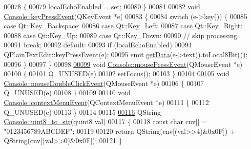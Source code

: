 \begin{DoxyCode}
00078 \{
00079     localEchoEnabled = set;
00080 \}
00081 
\hypertarget{a00087_source_l00082}{}\hyperlink{a00005_a558b58e3e68a167a7897a77bee78536c}{00082} \textcolor{keywordtype}{void} \hyperlink{a00005_a558b58e3e68a167a7897a77bee78536c}{Console::keyPressEvent}(QKeyEvent *e)
00083 \{
00084     \textcolor{keywordflow}{switch} (e->key()) \{
00085     \textcolor{keywordflow}{case} Qt::Key\_Backspace:
00086     \textcolor{keywordflow}{case} Qt::Key\_Left:
00087     \textcolor{keywordflow}{case} Qt::Key\_Right:
00088     \textcolor{keywordflow}{case} Qt::Key\_Up:
00089     \textcolor{keywordflow}{case} Qt::Key\_Down:
00090         \textcolor{comment}{// skip processing}
00091         \textcolor{keywordflow}{break};
00092     \textcolor{keywordflow}{default}:
00093         \textcolor{keywordflow}{if} (localEchoEnabled)
00094             QPlainTextEdit::keyPressEvent(e);
00095         emit \hyperlink{a00005_a1976aad46ce1a77be730bc628275038f}{getData}(e->text().toLocal8Bit());
00096     \}
00097 \}
00098 
\hypertarget{a00087_source_l00099}{}\hyperlink{a00005_a615736fd63c7fc70536e2b775b0ce745}{00099} \textcolor{keywordtype}{void} \hyperlink{a00005_a615736fd63c7fc70536e2b775b0ce745}{Console::mousePressEvent}(QMouseEvent *e)
00100 \{
00101     Q\_UNUSED(e)
00102     setFocus();
00103 \}
00104 
\hypertarget{a00087_source_l00105}{}\hyperlink{a00005_a1727cadc147a07ed86fd4cb91908fd5f}{00105} \textcolor{keywordtype}{void} \hyperlink{a00005_a1727cadc147a07ed86fd4cb91908fd5f}{Console::mouseDoubleClickEvent}(QMouseEvent *e)
00106 \{
00107     Q\_UNUSED(e)
00108 \}
00109 
\hypertarget{a00087_source_l00110}{}\hyperlink{a00005_a199dade448d3ae597d420dc65abca11c}{00110} \textcolor{keywordtype}{void} \hyperlink{a00005_a199dade448d3ae597d420dc65abca11c}{Console::contextMenuEvent}(QContextMenuEvent *e)
00111 \{
00112     Q\_UNUSED(e)
00113 \}
00114 
00115 
\hypertarget{a00087_source_l00116}{}\hyperlink{a00005_a9194022b884875614a4f7056454881c1}{00116} QString \hyperlink{a00005_a9194022b884875614a4f7056454881c1}{Console::uint8\_to\_str}(quint8 val)
00117 \{
00118     \textcolor{keyword}{const} \textcolor{keywordtype}{char} cnv[] = \textcolor{stringliteral}{"0123456789ABCDEF"};
00119 
00120     \textcolor{keywordflow}{return} QString(cnv[(val>>4)&0x0F]) + QString(cnv[(val>>0)&0x0F]);
00121 \}
\end{DoxyCode}
